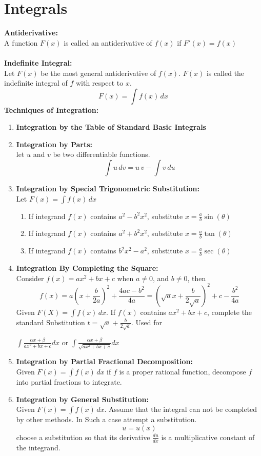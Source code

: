 \documentclass[14pt]{article}
\begin{document}
    \section{Integrals}
    \textbf{Antiderivative:}\\
    A function $F(x)$ is called an antiderivative of $f(x)$ if $F'(x)=f(x)$\\\\
    \textbf{Indefinite Integral:}\\
    Let $F(x)$ be the most general antiderivative of $f(x)$. $F(x)$ is called the indefinite integral of $f$ with respect to $x$.
    $$F(x)=\int f(x)\, dx$$
    \textbf{Techniques of Integration:}\\
    \begin{enumerate}
        \item \textbf{Integration by the Table of Standard Basic Integrals}
        \item \textbf{Integration by Parts:}\\
        let $u$ and $v$ be two differentiable functions.
        $$\int u\, dv=u\, v-\int v\, du$$
        \item \textbf{Integration by Special Trigonometric Substitution:}\\
        Let $F(x)=\int f(x)\, dx$
        \begin{enumerate}
            \item If integrand $f(x)$ contains $a^2-b^2x^2$, substitute $x=\frac{a}{b}\sin(\theta)$
            \item If integrand $f(x)$ contains $a^2+b^2x^2$, substitute $x=\frac{a}{b}\tan(\theta)$
            \item If integrand $f(x)$ contains $b^2x^2-a^2$, substitute $x=\frac{a}{b}\sec(\theta)$
        \end{enumerate}
        \item \textbf{Integration By Completing the Square:}\\
        Consider $f(x)=ax^2+bx+c$ when $a\neq 0$, and $b\neq 0$, then
        $$f(x)=a\left(x+\frac{b}{2a}\right)^2+\frac{4ac-b^2}{4a}=\left(\sqrt{a}x+\frac{b}{2\sqrt{a}}\right)^2+c-\frac{b^2}{4a}$$
        Given $F(X)=\int f(x) \, dx$. If $f(x)$ contains $ax^2+bx+c$, complete the standard Substitution $t=\sqrt{a}+\frac{b}{2\sqrt{a}}$. Used for
        \begin{center}
            $\int\frac{\alpha x+\beta}{ax^2+bx+c}dx$ or $\int\frac{\alpha x+\beta}{\sqrt{ax^2+bx+c}}dx $
        \end{center}
        \item \textbf{Integration by Partial Fractional Decomposition:}\\
        Given $F(x)=\int f(x) \,dx$ if $f$ is a proper rational function, decompose $f$ into partial fractions to integrate.
        \item \textbf{Integration by General Substitution:}\\
        Given $F(x)=\int f(x) \, dx$. Assume that the integral can not be completed by other methods. In Such a case attempt a substitution. $$u=u(x)$$ choose a substitution so that its derivative $\frac{du}{dx}$ is a multiplicative constant of the integrand.
    \end{enumerate}
\end{document}
